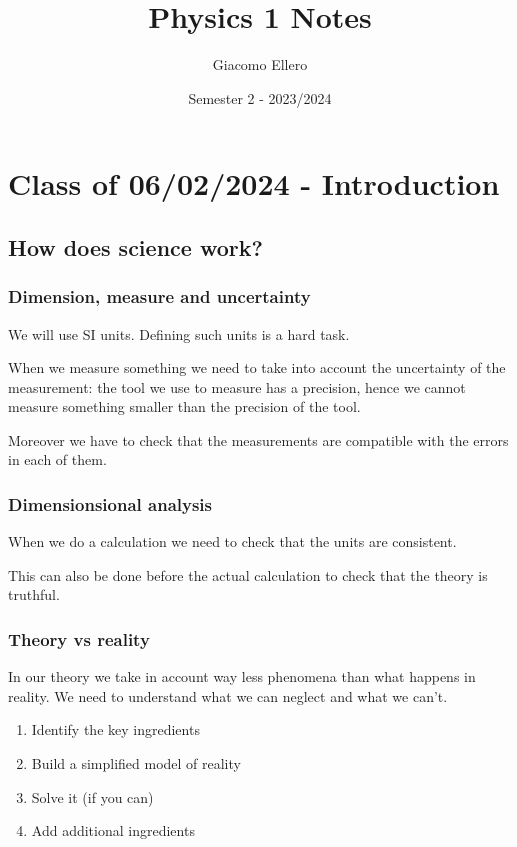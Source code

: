 \documentclass[10pt]{extarticle}
\title{Physics 1 Notes}
\author{Giacomo Ellero}
\date{Semester 2 - 2023/2024}
\begin{document}
\maketitle
\tableofcontents
\clearpage

\section{Class of 06/02/2024 - Introduction}

\subsection{How does science work?}

\subsubsection{Dimension, measure and uncertainty}

We will use SI units. Defining such units is a hard task.

When we measure something we need to take into account the uncertainty of the measurement:
the tool we use to measure has a precision, hence we cannot measure something smaller than the precision of the tool.

Moreover we have to check that the measurements are compatible with the errors in each of them.

\subsubsection{Dimensionsional analysis}

When we do a calculation we need to check that the units are consistent.

This can also be done before the actual calculation to check that the theory is truthful.

\subsubsection{Theory vs reality}

In our theory we take in account way less phenomena than what happens in reality.
We need to understand what we can neglect and what we can't.

\begin{enumerate}
    \item Identify the key ingredients
    \item Build a simplified model of reality
    \item Solve it (if you can)
    \item Add additional ingredients
\end{enumerate}
\end{document}
